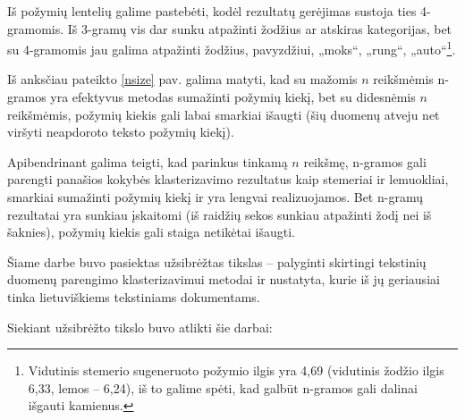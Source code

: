 \documentclass{VUMIFInfBakalaurinis}
\begin{document}
Iš požymių lentelių galime pastebėti, kodėl rezultatų gerėjimas sustoja
ties 4-gramomis. Iš 3-gramų vis dar sunku atpažinti žodžius ar atskiras
kategorijas, bet su 4-gramomis jau galima atpažinti žodžius, pavyzdžiui,
„moks“, „rung“, „auto“\footnote{Vidutinis stemerio sugeneruoto
  požymio ilgis yra 4,69 (vidutinis žodžio ilgis 6,33, lemos -- 6,24),
  iš to galime spėti, kad galbūt n-gramos gali dalinai išgauti kamienus.}.

Iš anksčiau pateikto \ref{nsize} pav. galima
matyti, kad su mažomis $n$ reikšmėmis n-gramos yra efektyvus
metodas sumažinti požymių kiekį, bet su didesnėmis $n$ reikšmėmis,
požymių kiekis gali labai smarkiai išaugti (šių duomenų atveju net
viršyti neapdoroto teksto požymių kiekį).

Apibendrinant galima teigti, kad parinkus tinkamą $n$
reikšmę, n-gramos gali parengti panašios kokybės klasterizavimo
rezultatus kaip stemeriai ir lemuokliai, smarkiai sumažinti požymių
kiekį ir yra lengvai realizuojamos. Bet n-gramų rezultatai yra sunkiau
įskaitomi (iš raidžių sekos sunkiau atpažinti žodį nei iš šaknies),
požymių kiekis gali staiga netikėtai išaugti.

Šiame darbe buvo pasiektas užsibrėžtas tikslas -- palyginti skirtingi
tekstinių duomenų parengimo klasterizavimui metodai ir nustatyta, kurie
iš jų geriausiai tinka lietuviškiems tekstiniams dokumentams.

Siekiant užsibrėžto tikslo buvo atlikti šie darbai:
\end{document}
